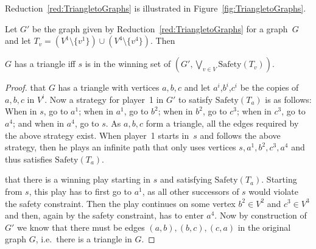 \documentclass[11pt,letterpaper]{article}
\newcommand{\objsty}[2]{\textrm{#1}\left(#2\right)}
\newcommand{\target}{T\xspace}
\newif\iffullversion
\newcommand{\infull}[1]{\iffullversion #1\fi}
\newcommand{\inshort}[1]{\iffullversion \else #1\fi}
\begin{document}
Reduction~\ref{red:TriangletoGraphs} is illustrated in Figure~\ref{fig:TriangletoGraphs}.

\begin{lemma}
 Let $G'$ be the graph given by Reduction~\ref{red:TriangletoGraphs} for a graph~$G$
 and  
 let $\target_v= (V^1 \setminus \{v^1\}) \cup (V^4 \setminus \{v^4\})$. Then 
    \infull{the following statements are equivalent.
  \begin{enumerate}
  \item
  $G$ has a triangle.
  \item $s$ is in the winning set of  $(G',\bigvee_{v \in V} \objsty{Safety}{\target_v})$.
  \item The winning set of $(G', \bigvee_{v \in V} \objsty{Safety}{\target_v})$ is non-empty.
  \end{enumerate}
  }
  \inshort{$G$ has a triangle iff $s$ is in the winning set of  $(G',\bigvee_{v \in V} \objsty{Safety}{\target_v})$.}
\end{lemma}
\begin{proof}
 \infull{(1)$\Rightarrow$(2): Assume} that
 $G$ has a triangle with vertices $a,b,c$ and 
 let $a^i$,$b^i$,$c^i$ be the copies of $a,b,c$ in $V^i$.
 Now a strategy for player~1 in $G'$ to satisfy $\objsty{Safety}{\target_a}$ is as follows:
 When in $s$, go to $a^1$; when in $a^1$, go to $b^2$; when in $b^2$, go to $c^3$;
 when in $c^3$, go to $a^4$; and when in $a^4$, go to $s$.
 As $a,b,c$ form a triangle, all the edges required by the above strategy exist.
 When player~1 starts in~$s$ and follows the above strategy,
 then he plays an infinite path
 that only uses vertices $s,a^1,b^2,c^3,a^4$ and thus satisfies $\objsty{Safety}{\target_a}$.

 \infull{(2)$\Rightarrow$(1): Assume} that there is a
 winning play starting in $s$ and satisfying $\objsty{Safety}{\target_a}$.
 Starting from $s$, this play has to first go to $a^1$, as all other successors of $s$ would violate
 the safety constraint. Then the play continues on some vertex $b^2 \in V^2$ and $c^3 \in V^3$
 and then, again by the safety constraint, has to enter $a^4$.
 Now by construction of $G'$ we know that there must be edges $(a,b), (b,c), (c,a)$ in the original graph $G$,
 i.e.\ there is a triangle in $G$.  \infull{
 
 (2)$\Leftrightarrow$(3): Notice that when removing $s$ from $G'$ we get an acyclic graph and thus each infinite
 path has to contain $s$ infinitely often. Thus, if the winning set is non-empty,
 there is a cycle winning for some vertex and then 
 this cycle is also winning for $s$. For the converse direction we have that if $s$ is in the winning set, then the winning set is non-empty.}
\end{proof}
\end{document}
